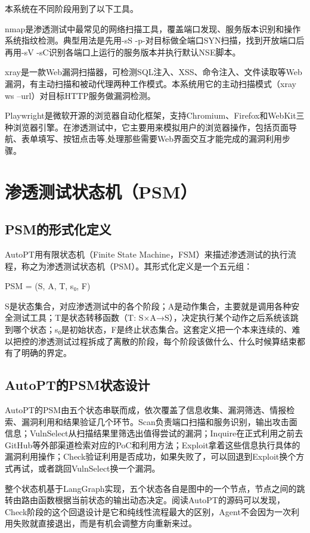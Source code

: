 本系统在不同阶段用到了以下工具。

nmap是渗透测试中最常见的网络扫描工具，覆盖端口发现、服务版本识别和操作系统指纹检测。典型用法是先用-sS -p-对目标做全端口SYN扫描，找到开放端口后再用-sV -sC识别各端口上运行的服务版本并执行默认NSE脚本。

xray是一款Web漏洞扫描器，可检测SQL注入、XSS、命令注入、文件读取等Web漏洞，有主动扫描和被动代理两种工作模式。本系统用它的主动扫描模式（xray ws --url）对目标HTTP服务做漏洞检测。

Playwright是微软开源的浏览器自动化框架，支持Chromium、Firefox和WebKit三种浏览器引擎。在渗透测试中，它主要用来模拟用户的浏览器操作，包括页面导航、表单填写、按钮点击等,处理那些需要Web界面交互才能完成的漏洞利用步骤。

\section{渗透测试状态机（PSM）}

\subsection{PSM的形式化定义}

AutoPT\cite{Wu2024AutoPT}用有限状态机（Finite State Machine，FSM）来描述渗透测试的执行流程，称之为渗透测试状态机（PSM）。其形式化定义是一个五元组：

PSM = (S, A, T, s₀, F)

S是状态集合，对应渗透测试中的各个阶段；A是动作集合，主要就是调用各种安全测试工具；T是状态转移函数（T: S×A→S），决定执行某个动作之后系统该跳到哪个状态；s₀是初始状态，F是终止状态集合。这套定义把一个本来连续的、难以把控的渗透测试过程拆成了离散的阶段，每个阶段该做什么、什么时候算结束都有了明确的界定。

\subsection{AutoPT的PSM状态设计}

AutoPT的PSM由五个状态串联而成，依次覆盖了信息收集、漏洞筛选、情报检索、漏洞利用和结果验证几个环节。Scan负责端口扫描和服务识别，输出攻击面信息；VulnSelect从扫描结果里筛选出值得尝试的漏洞；Inquire在正式利用之前去GitHub等外部渠道检索对应的PoC和利用方法；Exploit拿着这些信息执行具体的漏洞利用操作；Check验证利用是否成功，如果失败了，可以回退到Exploit换个方式再试，或者跳回VulnSelect换一个漏洞。

整个状态机基于LangGraph实现，五个状态各自是图中的一个节点，节点之间的跳转由路由函数根据当前状态的输出动态决定。阅读AutoPT的源码可以发现，Check阶段的这个回退设计是它和纯线性流程最大的区别，Agent不会因为一次利用失败就直接退出，而是有机会调整方向重新来过。

